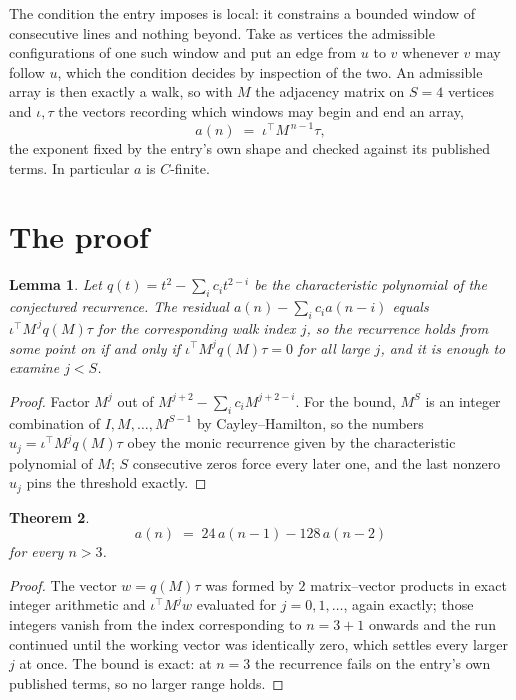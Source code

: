 \documentclass[11pt,a4paper]{article}
\theoremstyle{plain}
\newtheorem{theorem}{Theorem}
\newtheorem{lemma}[theorem]{Lemma}
\theoremstyle{definition}
\begin{document}
The condition the entry imposes is local: it constrains a bounded window of consecutive lines and nothing beyond. Take as
vertices the admissible configurations of one such window and put an edge from $u$ to $v$
whenever $v$ may follow $u$, which the condition decides by inspection of the two. An
admissible array is then exactly a walk, so with $M$ the adjacency matrix on $S=4$ vertices
and $\iota,\tau$ the vectors recording which windows may begin and end an array,
\[
a(n)\;=\;\iota^{\!\top}M^{\,n-1}\tau ,
\]
the exponent fixed by the entry's own shape and checked against its published terms. In
particular $a$ is $C$-finite.

\section{The proof}

\begin{lemma}\label{lem:crit}
Let $q(t)=t^{2}-\sum_i c_it^{2-i}$ be the characteristic polynomial of the
conjectured recurrence. The residual $a(n)-\sum_ic_ia(n-i)$ equals
$\iota^{\!\top}M^{\,j}q(M)\tau$ for the corresponding walk index $j$, so the recurrence
holds from some point on if and only if $\iota^{\!\top}M^{j}q(M)\tau=0$ for all large $j$,
and it is enough to examine $j<S$.
\end{lemma}

\begin{proof}
Factor $M^{j}$ out of $M^{j+2}-\sum_ic_iM^{j+2-i}$. For the bound, $M^{S}$
is an integer combination of $I,M,\dots,M^{S-1}$ by Cayley--Hamilton, so the numbers
$u_j=\iota^{\!\top}M^{j}q(M)\tau$ obey the monic recurrence given by the characteristic
polynomial of $M$; $S$ consecutive zeros force every later one, and the last nonzero $u_j$
pins the threshold exactly.
\end{proof}

\begin{theorem}
\[
a(n)\;=\;24\,a(n-1) - 128\,a(n-2)
\]
for every $n>3$.
\end{theorem}

\begin{proof}
The vector $w=q(M)\tau$ was formed by $2$ matrix--vector products in exact integer
arithmetic and $\iota^{\!\top}M^{j}w$ evaluated for $j=0,1,\dots$, again exactly; those
integers vanish from the index corresponding to $n=3+1$ onwards and the run continued
until the working vector was identically zero, which settles every larger $j$ at once. The bound is exact: at $n=3$ the recurrence fails on the entry's own published terms, so no larger range holds.
\end{proof}
\end{document}
